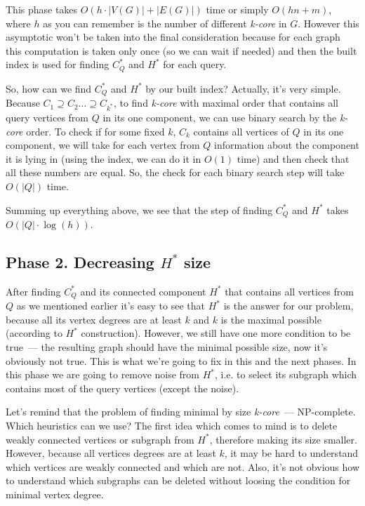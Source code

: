 This phase takes $O(h \cdot |V(G)| + |E(G)|)$ time or simply $O(hn + m)$, where $h$ as you can remember is the number of different \textit{k-core} in $G$. However this asymptotic won't be taken into the final consideration because for each graph this computation is taken only once (so we can wait if needed) and then the built index is used for finding $C_Q^*$ and $H^*$ for each query.

So, how can we find $C_Q^*$ and $H^*$ by our built index? Actually, it's very simple. Because $C_1 \supseteq C_2 \ldots \supseteq C_{k^*}$, to find \textit{k-core} with maximal order that contains all query vertices from $Q$ in its one component, we can use binary search by the \textit{k-core} order. To check if for some fixed $k$, $C_k$ contains all vertices of $Q$ in its one component, we will take for each vertex from $Q$ information about the component it is lying in (using the index, we can do it in $O(1)$ time) and then check that all these numbers are equal. So, the check for each binary search step will take $O(|Q|)$ time.

Summing up everything above, we see that the step of finding $C_Q^*$ and $H^*$ takes $O(|Q| \cdot \log(h))$.

\subsection{Phase 2. Decreasing $H^*$ size}

After finding $C_Q^*$ and its connected component $H^*$ that contains all vertices from $Q$ as we mentioned earlier it's easy to see that $H^*$ is the answer for our problem, because all its vertex degrees are at least $k$ and $k$ is the maximal possible (according to $H^*$ construction). However, we still have one more condition to be true~--- the resulting graph should have the minimal possible size, now it's obviously not true. This is what we're going to fix in this and the next phases. In this phase we are going to remove noise from $H^*$, i.e. to select its subgraph which contains most of the query vertices (except the noise).

Let's remind that the problem of finding minimal by size \textit{k-core}~--- NP-complete. Which heuristics can we use? The first idea which comes to mind is to delete weakly connected vertices or subgraph from $H^*$, therefore making its size smaller. However, because all vertices degrees are at least $k$, it may be hard to understand which vertices are weakly connected and which are not. Also, it's not obvious how to understand which subgraphs can be deleted without loosing the condition for minimal vertex degree.

